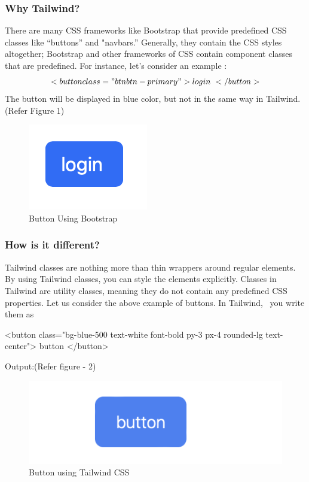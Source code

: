 \documentclass[conference]{IEEEtran}
\begin{document}
\subsubsection{Why Tailwind?}There are many CSS frameworks like Bootstrap that provide predefined CSS classes like “buttons” and "navbars.” Generally, they contain the CSS styles altogether; Bootstrap and other frameworks of CSS contain component classes that are predefined. For instance, let's consider an example :
\[ <button class="btn btn-primary"> login </button> \]
The button will be displayed in blue color, but not in the same way in Tailwind. (Refer Figure 1)
\begin{figure}
    \centering
    \includegraphics[width=0.5\linewidth]{Screenshot 2023-08-11 at 14.29.11.png}
    \caption{Button Using Bootstrap}
    \label{fig: button} 
\end{figure}
\subsubsection{How is it different?} Tailwind classes are nothing more than thin wrappers around regular elements. By using Tailwind classes, you can style the elements explicitly. Classes in Tailwind are utility classes, meaning they do not contain any predefined CSS properties. Let us consider the above example of buttons. In Tailwind,  you write them as 
\newline

\textless button class="bg-blue-500 text-white  font-bold py-3
px-4  rounded-lg text-center"\textgreater{}
           button
\textless/button\textgreater{} 

Output:(Refer figure - 2)
\newline

\begin{figure}
    \centering
    \includegraphics[width=1\linewidth]{normal_button.png}
    \caption{Button using Tailwind CSS}
    \label{fig:enter-label}
\end{figure}
\end{document}
